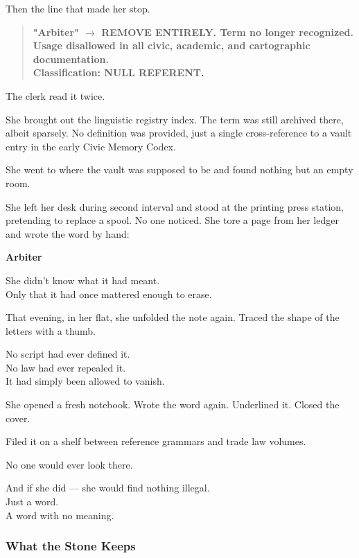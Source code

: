 \documentclass[12pt]{article}
\begin{document}
Then the line that made her stop.

\begin{quote}
\textbf{"Arbiter" $\rightarrow$ REMOVE ENTIRELY. Term no longer recognized. Usage disallowed in all civic, academic, and cartographic documentation.} \\
\textbf{Classification: NULL REFERENT.}
\end{quote}

The clerk read it twice.

She brought out the linguistic registry index. The term was still archived there, albeit sparsely. No definition was provided, just a single cross-reference to a vault entry in the early Civic Memory Codex.

She went to where the vault was supposed to be and found nothing but an empty room.

\vspace{1em}

She left her desk during second interval and stood at the printing press station, pretending to replace a spool. No one noticed. She tore a page from her ledger and wrote the word by hand:

\begin{center}
\textbf{Arbiter}
\end{center}

She didn’t know what it had meant.\\
Only that it had once mattered enough to erase.

\vspace{1em}

That evening, in her flat, she unfolded the note again. Traced the shape of the letters with a thumb.

No script had ever defined it.\\
No law had ever repealed it.\\
It had simply been allowed to vanish.

She opened a fresh notebook. Wrote the word again. Underlined it. Closed the cover.

Filed it on a shelf between reference grammars and trade law volumes.

No one would ever look there.

And if she did --- she would find nothing illegal.\\
Just a word.\\
A word with no meaning.


\dotfill

\subsubsection{What the Stone Keeps}
\end{document}
